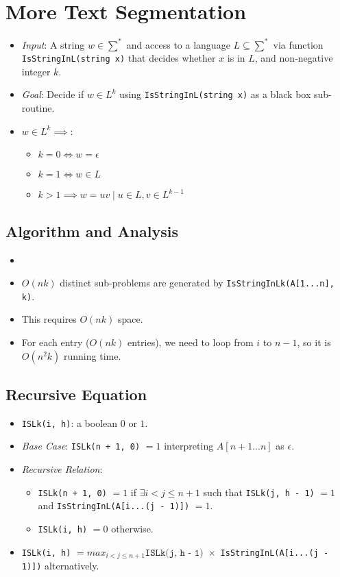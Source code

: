 
\section{More Text Segmentation}
\begin{itemize}
    \item \textit{Input}: A string $w \in \sum^{\ast}$ and access to a language $L \subseteq \sum^{\ast}$ via function \texttt{IsStringInL(string x)} that decides whether $x$ is in $L$, and non-negative integer $k$.
    \item \textit{Goal}: Decide if $w \in L^k$ using \texttt{IsStringInL(string x)} as a black box sub-routine.
    \item $w \in L^k \implies$:
    \begin{itemize}
        \item $k = 0 \iff w = \epsilon$
        \item $k = 1 \iff w \in L$
        \item $k > 1 \implies w = uv \mid  u \in L, v \in L^{k - 1}$
    \end{itemize}
\end{itemize}

\subsection{Algorithm and Analysis}
\begin{itemize}
    \item[] 
    \item $O(nk)$ distinct sub-problems are generated by \texttt{IsStringInLk(A[1...n], k)}.
    \item This requires $O(nk)$ space.
    \item For each entry ($O(nk)$ entries), we need to loop from $i$ to $n - 1$, so it is $O(n^2k)$ running time.
\end{itemize}

\subsection{Recursive Equation}
\begin{itemize}
    \item \texttt{ISLk(i, h)}: a boolean $0$ or $1$.
    \item \textit{Base Case}: \texttt{ISLk(n + 1, 0)} $= 1$ interpreting $A[n + 1...n]$ as $\epsilon$.
    \item \textit{Recursive Relation}:
    \begin{itemize}
        \item \texttt{ISLk(n + 1, 0)} $= 1$ if $\exists i < j \leq n + 1$ such that \texttt{ISLk(j, h - 1)} $= 1$ and \texttt{IsStringInL(A[i...(j - 1)])} $= 1$.
        \item \texttt{ISLk(i, h)} $= 0$ otherwise.
    \end{itemize}
    \item \texttt{ISLk(i, h)} $= max_{i < j \leq n + 1}\texttt{ISLk(j, h - 1) }\times$ \texttt{IsStringInL(A[i...(j - 1)])} alternatively.
\end{itemize}

